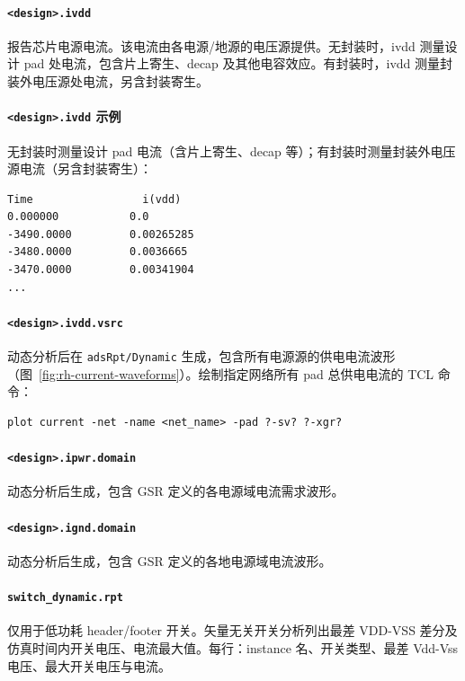 \paragraph{\texttt{<design>.ivdd}}
报告芯片电源电流。该电流由各电源/地源的电压源提供。无封装时，ivdd 测量设计 pad 处电流，包含片上寄生、decap 及其他电容效应。有封装时，ivdd 测量封装外电压源处电流，另含封装寄生。
\paragraph{\texttt{<design>.ivdd} 示例}
无封装时测量设计 pad 电流（含片上寄生、decap 等）；有封装时测量封装外电压源电流（另含封装寄生）：
\begin{lstlisting}
Time                 i(vdd)
0.000000           0.0
-3490.0000         0.00265285
-3480.0000         0.0036665
-3470.0000         0.00341904
...
\end{lstlisting}


\paragraph{\texttt{<design>.ivdd.vsrc}}
动态分析后在 \texttt{adsRpt/Dynamic} 生成，包含所有电源源的供电电流波形（图~\ref{fig:rh-current-waveforms}）。绘制指定网络所有 pad 总供电电流的 TCL 命令：
\begin{lstlisting}
plot current -net -name <net_name> -pad ?-sv? ?-xgr?
\end{lstlisting}

\label{fig:rh-current-waveforms}

\paragraph{\texttt{<design>.ipwr.domain}}
动态分析后生成，包含 GSR  定义的各电源域电流需求波形。

\paragraph{\texttt{<design>.ignd.domain}}
动态分析后生成，包含 GSR  定义的各地电源域电流波形。

\paragraph{\texttt{switch\_dynamic.rpt}}
仅用于低功耗 header/footer 开关。矢量无关开关分析列出最差 VDD-VSS 差分及仿真时间内开关电压、电流最大值。每行：instance 名、开关类型、最差 Vdd-Vss 电压、最大开关电压与电流。

